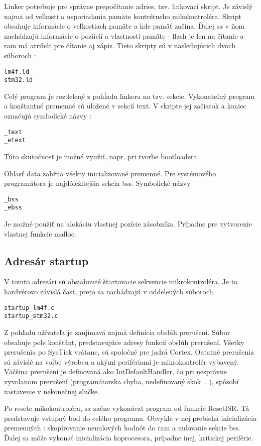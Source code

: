 Linker potrebuje pre správne prepočítanie adries, tzv. linkovací skript. Je závislý najmä od veĺkosti a usporiadania pamäte kontrétneho mikokontroléra. Skript obsahuje informácie o veľkostiach pamäte a kde pamäť začína. Ďalej sa v ňom nachádzajú informácie o poziícií a vlastnosti pamäte - flash je len na čítanie a ram má atribút pre čítanie aj zápis.
Tieto skripty sú v nasledujúcich dvoch súboroch :
{\small
\begin{verbatim}
lm4f.ld
stm32.ld
\end{verbatim}
}

Celý program je rozdelený z pohĺadu linkera na tzv. sekcie. Vykonateľný program a konštantné premenné sú uložené v sekcií text. V skripte jej začiatok a koniec označujú symbolické názvy :
{\small
\begin{verbatim}
_text
_etext
\end{verbatim}
}
Túto skutočnosť je možné využiť, napr. pri tvorbe bootloadera.

Oblasť data zahŕňa všekty inicializované premenné.
Pre systémového programátora je najdôležitejšia sekcia bss. Symbolické názvy
{\small
\begin{verbatim}
_bss
_ebss
\end{verbatim}
}
Je možné použiť na alokáciu vlastnej pozície zásobníka. Prípadne pre vytvorenie vlastnej funkcie malloc.

\subsection{Adresár startup}

V tomto adresári sú obsiahnuté štartovacie sekvencie mikrokontroléra. Je to hardvérovo závislá časť, preto sa nachádzajú v oddelených súboroch.
{\small
\begin{verbatim}
startup_lm4f.c
startup_stm32.c
\end{verbatim}
}

Z pohľadu užívateľa je zaujímavá najmä definícia obslúh prerušení. Súbor obsahuje pole konštánt, predstavujúce adresy funkcií obslúh prerušení. Všetky prerušenia po SysTick vrátane, sú spoločné pre jadrá Cortex. Oatatné prerušenia sú závislé na voľbe výrobcu a akými perifériami je mikrokontrolér vybavený. Väčšina prerušení je definovaná ako IntDefaultHandler, čo pri nesprávne vyvolanom prerušení (programátorska chyba, nedefinovaný skok ...), spôsobí zastavenie v nekonečnej slučke.

Po resete mikokontroléra, sa začne vykonávať program od funkcie ResetISR. Tá predstavuje vstupný bod do celého programu. Obvykle v nej prebieha inicializácia premenných : skopírovanie nenulových hodnôt do ram a nulovanie sekcie bss. Ďalej sa môže vykonať inicializácia koprocesora, prípadne inej, kritickej periférie.

